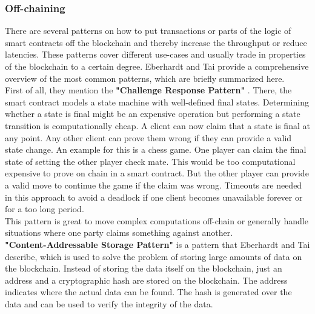 \documentclass[a4paper,12pt]{scrartcl}
\begin{document}
\subsubsection{Off-chaining}

There are several patterns on how to put transactions or parts of the logic of smart contracts off the blockchain and thereby increase the throughput or reduce latencies. These patterns cover different use-cases and usually trade in properties of the blockchain to a certain degree. Eberhardt and Tai   \cite{eberhardt2017or} provide a comprehensive overview of the most common patterns, which are briefly summarized here.\\

First of all, they mention the \textbf{"Challenge Response Pattern"} \cite{eberhardt2017or}. There, the smart contract models a state machine with well-defined final states. Determining whether a state is final might be an expensive operation but performing a state transition is computationally cheap. A client can now claim that a state is final at any point. Any other client can prove them wrong if they can provide a valid state change. An example for this is a chess game. One player can claim the final state of setting the other player check mate. This would be too computational expensive to prove on chain in a smart contract. But the other player can provide a valid move to continue the game if the claim was wrong. Timeouts are needed in this approach to avoid a deadlock if one client becomes unavailable forever or for a too long period.\\
This pattern is great to move complex computations off-chain or generally handle situations where one party claims something against another.\\

\textbf{"Content-Addressable Storage Pattern"} is a pattern that Eberhardt and Tai \cite{eberhardt2017or} describe, which is used to solve the problem of storing large amounts of data on the blockchain. Instead of storing the data itself on the blockchain, just an address and a cryptographic hash are stored on the blockchain. The address indicates where the actual data can be found. The hash is generated over the data and can be used to verify the integrity of the data.\\
\end{document}
